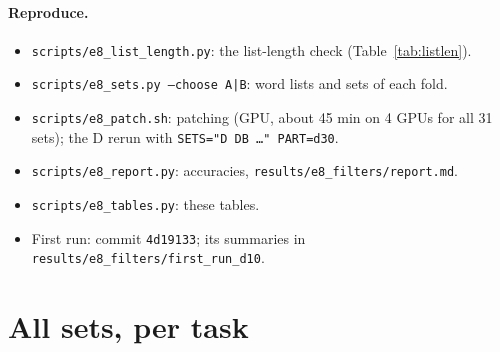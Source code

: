 \documentclass[10pt,a4paper]{article}
\begin{document}
\paragraph{Reproduce.}
\begin{itemize}
\item \texttt{scripts/e8\_list\_length.py}: the list-length check (Table~\ref{tab:listlen}).
\item \texttt{scripts/e8\_sets.py --choose A|B}: word lists and sets of each fold.
\item \texttt{scripts/e8\_patch.sh}: patching (GPU, about 45 min on 4 GPUs for all 31 sets); the D rerun with \texttt{SETS="D DB \dots" PART=d30}.
\item \texttt{scripts/e8\_report.py}: accuracies, \texttt{results/e8\_filters/report.md}.
\item \texttt{scripts/e8\_tables.py}: these tables.
\item First run: commit \texttt{4d19133}; its summaries in \texttt{results/\allowbreak e8\_filters/\allowbreak first\_run\_d10}.
\end{itemize}

\appendix
\section{All sets, per task}

\begin{table}[H]\centering\scriptsize
\resizebox{\linewidth}{!}{}
\caption{Check 1, task accuracy at the cross-fitted $\alpha$, every set and task, mean of the two folds. Blank: empty set.}
\label{tab:all1}
\end{table}

\begin{table}[H]\centering\scriptsize
\resizebox{\linewidth}{!}{}
\caption{Check 2, as Table~\ref{tab:all1}.}
\label{tab:all2}
\end{table}
\end{document}
